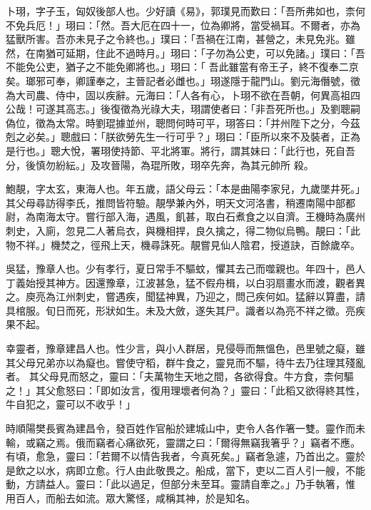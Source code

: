 \begin{pinyinscope}
 卜珝，字子玉，匈奴後部人也。少好讀《易》，郭璞見而歎曰：「吾所弗如也，柰何不免兵厄！」珝曰：「然。吾大厄在四十一，位為卿將，當受禍耳。不爾者，亦為猛獸所害。吾亦未見子之令終也。」璞曰：「吾禍在江南，甚營之，未見免兆。雖然，在南猶可延期，住此不過時月。」珝曰：「子勿為公吏，可以免諸。」璞曰：「吾不能免公吏，猶子之不能免卿將也。」珝曰：「
 吾此雖當有帝王子，終不復奉二京矣。瑯邪可奉，卿謹奉之，主晉記者必雌也。」珝遂隱于龍門山。劉元海僭號，徵為大司農、侍中，固以疾辭。元海曰：「人各有心，卜珝不欲在吾朝，何異高祖四公哉！可遂其高志。」後復徵為光祿大夫，珝謂使者曰：「非吾死所也。」及劉聰嗣偽位，徵為太常。時劉琨據並州，聰問何時可平，珝答曰：「并州陛下之分，今茲剋之必矣。」聰戲曰：「朕欲勞先生一行可乎？」珝曰：「臣所以來不及裝者，正為是行也。」聰大悅，署珝使持節、平北將軍。將行，謂其妹曰：「此行也，死自吾分，後慎勿紛紜。」及攻晉陽，為琨所敗，珝卒先奔，為其元帥所
 殺。



 鮑靚，字太玄，東海人也。年五歲，語父母云：「本是曲陽李家兒，九歲墜井死。」其父母尋訪得李氏，推問皆符驗。靚學兼內外，明天文河洛書，稍遷南陽中部都尉，為南海太守。嘗行部入海，遇風，飢甚，取白石煮食之以自濟。王機時為廣州刺史，入廁，忽見二人著烏衣，與機相捍，良久擒之，得二物似烏鴨。靚曰：「此物不祥。」機焚之，徑飛上天，機尋誅死。靚嘗見仙人陰君，授道訣，百餘歲卒。



 吳猛，豫章人也。少有孝行，夏日常手不驅蚊，懼其去己而噬親也。年四十，邑人丁義始授其神方。因還豫章，江波甚急，猛不假舟楫，以白羽扇畫水而渡，觀者異之。庾亮為江州刺史，嘗遇疾，聞猛神異，乃迎之，問己疾何如。猛辭以算盡，請具棺服。旬日而死，形狀如生。未及大斂，遂失其尸。識者以為亮不祥之徵。亮疾果不起。



 幸靈者，豫章建昌人也。性少言，與小人群居，見侵辱而無慍色，邑里號之癡，雖其父母兄弟亦以為癡也。嘗使守稻，群牛食之，靈見而不驅，待牛去乃往理其殘亂者。
 其父母見而怒之，靈曰：「夫萬物生天地之間，各欲得食。牛方食，柰何驅之！」其父愈怒曰：「即如汝言，復用理壞者何為？」靈曰：「此稻又欲得終其性，牛自犯之，靈可以不收乎！」



 時順陽樊長賓為建昌令，發百姓作官船於建城山中，吏令人各作箸一雙。靈作而未輸，或竊之焉。俄而竊者心痛欲死，靈謂之曰：「爾得無竊我箸乎？」竊者不應。有頃，愈急，靈曰：「若爾不以情告我者，今真死矣。」竊者急遽，乃首出之。靈於是飲之以水，病即立愈。行人由此敬畏之。船成，當下，吏以二百人引一艘，不能動，方請益人。靈曰：「此以過足，但部分未至耳。靈請自牽之。」乃手執箸，惟
 用百人，而船去如流。眾大驚怪，咸稱其神，於是知名。




\end{pinyinscope}
